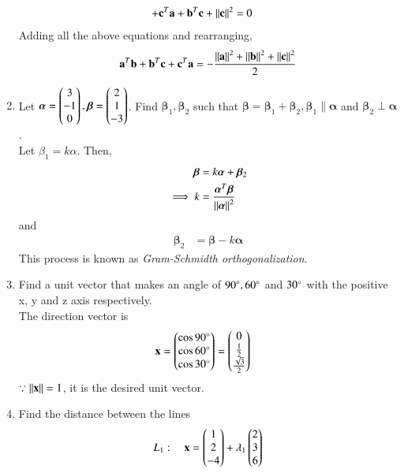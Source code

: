 \begin{enumerate}[label=\arabic*.,ref=\thesubsection.\theenumi]
\begin{align}
\\
+\mathbf{c}^T\mathbf{a}+\mathbf{b}^T\mathbf{c}+\left\lVert \mathbf{c}\right\rVert^2 &= 0
\end{align}
%
Adding all the above equations and rearranging,
\begin{multline}
 \mathbf{a}^T\mathbf{b}+\mathbf{b}^T\mathbf{c}+\mathbf{c}^T\mathbf{a} = -\frac{\left\lVert \mathbf{a}\right\rVert^2+\left\lVert \mathbf{b}\right\rVert^2+\left\lVert \mathbf{c}\right\rVert^2}{2}
\end{multline}
%
\item Let $\bm{\alpha} = \begin{pmatrix}3\\-1\\0\end{pmatrix}, \bm{\beta} = \begin{pmatrix}2\\1\\-3\end{pmatrix}$.  Find $\bm{\beta}_1, \bm{\beta}_2 $ such that $\bm{\beta}=\bm{\beta}_1+\bm{\beta}_2, \bm{\beta}_1 \parallel  \bm{\alpha} $ and $\bm{\beta}_2 \perp \bm{\alpha} $.
%
\label{prob:line_gram_schmidt}
\\
\solution Let $\beta_1 = k\alpha$.  Then, 
%
\begin{align}
\bm{\beta} &= k\bm{\alpha}+\bm{\beta}_2
\\
\implies k &= \frac{\bm{\alpha}^T\bm{\beta}}{\left\lVert\bm{\alpha}\right\rVert^2}
\end{align}
%
and 
%
\begin{align}
\bm{\beta}_2 &= \bm{\beta}-k\bm{\alpha}
\end{align}
%
This process is known as {\em Gram-Schmidth orthogonalization}.
\item Find a unit vector that makes an angle of $90\degree, 60\degree$ and $30\degree$ with the positive x, y and z axis respectively.
%
\\
\solution
The direction vector is
%
\begin{align}
\label{eq:line_dir_cos}
\mathbf{x} &= \begin{pmatrix}\cos 90\degree\\\cos 60\degree \\ \cos 30\degree\end{pmatrix} = \begin{pmatrix}0 \\ \frac{1}{2}\\\frac{\sqrt{3}}{2}\end{pmatrix}
\end{align}
%
$\because \left\lVert\mathbf{x}\right\rVert=1$, it is the desired unit vector.
%
\item Find the 
distance between the lines 
\begin{align}
L_1: \quad \vec{x} &= \myvec{1\\2\\-4} + \lambda_1\myvec{2 \\ 3 \\6}
\\

\end{align}
\end{enumerate}
